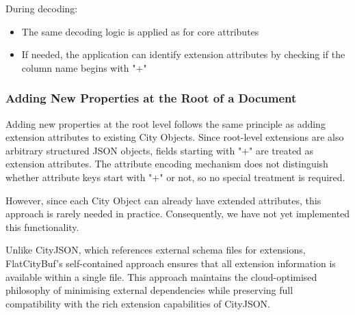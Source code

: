 During decoding:
\begin{itemize}
  \item The same decoding logic is applied as for core attributes
  \item If needed, the application can identify extension attributes by checking if the column name begins with "+"
\end{itemize}

\subsubsection{Adding New Properties at the Root of a Document}
\label{methodology:feature_encoding:extension_mechanism:adding_new_properties_at_the_root_of_a_document}

Adding new properties at the root level follows the same principle as adding extension attributes to existing City Objects. Since root-level extensions are also arbitrary structured JSON objects, fields starting with "+" are treated as extension attributes. The attribute encoding mechanism does not distinguish whether attribute keys start with "+" or not, so no special treatment is required.

However, since each City Object can already have extended attributes, this approach is rarely needed in practice. Consequently, we have not yet implemented this functionality.

Unlike CityJSON, which references external schema files for extensions, FlatCityBuf's self-contained approach ensures that all extension information is available within a single file. This approach maintains the cloud-optimised philosophy of minimising external dependencies while preserving full compatibility with the rich extension capabilities of CityJSON.

